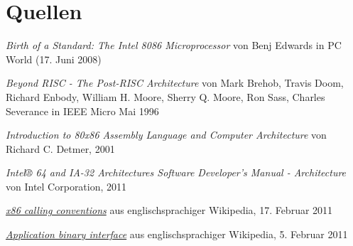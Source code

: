 \section{Quellen}

\begin{thebibliography}{9}

  \emph{Birth of a Standard: The Intel 8086 Microprocessor}
	von Benj Edwards
	in PC World (17. Juni 2008)

	\emph{Beyond RISC - The Post-RISC Architecture}
	von Mark Brehob, Travis Doom, Richard Enbody, William H. Moore, Sherry Q. Moore, Ron Sass, Charles Severance
	in IEEE Micro Mai 1996

	\emph{Introduction to 80x86 Assembly Language and Computer Architecture}
	von Richard C. Detmer,
	2001

	\emph{Intel® 64 and IA-32 Architectures Software Developer's Manual - Architecture}
	von Intel Corporation,
	2011

	\href{https://secure.wikimedia.org/wikipedia/en/w/index.php?title=X86_calling_conventions&oldid=414385219}{\emph{x86 calling conventions}} aus englischsprachiger Wikipedia, 17. Februar 2011

	\href{https://secure.wikimedia.org/wikipedia/en/w/index.php?title=Application_binary_interface&oldid=412119478}{\emph{Application binary interface}} aus englischsprachiger Wikipedia, 5. Februar 2011

\end{thebibliography}
